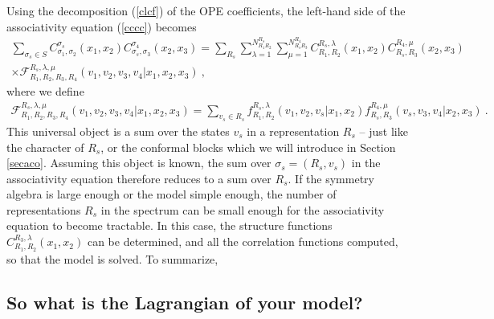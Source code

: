 \documentclass[12pt,a4paper,notitlepage]{report}
\numberwithin{equation}{section}
\theoremstyle{break}
\begin{document}
Using the decomposition (\ref{clcf}) of the OPE coefficients, 
the left-hand side of the 
associativity equation (\ref{cccc}) becomes
\begin{multline}
 \sum_{\sigma_s\in S} C_{\sigma_1,\sigma_2}^{\sigma_s}(x_1,x_2) C_{\sigma_s,\sigma_3}^{\sigma_4}(x_2,x_3) 
= \sum_{R_s}\sum_{\lambda=1}^{N_{R_1R_2}^{R_s}} \sum_{\mu=1}^{N_{R_sR_3}^{R_4}} C_{R_1,R_2}^{R_s,\lambda}(x_1,x_2) C_{R_s,R_3}^{R_4,\mu}(x_2,x_3)
\\ 
\times 
\mathcal{F}^{R_s,\lambda,\mu}_{R_1,R_2,R_3,R_4}(v_1,v_2,v_3,v_4|x_1,x_2,x_3)\ ,
\label{scce}
\end{multline}
where we define 
\begin{align}
 \mathcal{F}^{R_s,\lambda,\mu}_{R_1,R_2,R_3,R_4}(v_1,v_2,v_3,v_4|x_1,x_2,x_3) = \sum_{v_s\in R_s} f_{R_1,R_2}^{R_s,\lambda}(v_1,v_2,v_s|x_1,x_2) f_{R_s,R_3}^{R_4,\mu}(v_s,v_3,v_4|x_2,x_3) \ .
\end{align}
This universal object is a sum over the states $v_s$ in a representation $R_s$ -- just like the character of $R_s$, or the conformal blocks which we will introduce in Section \ref{secaco}.
Assuming this object is known, the sum over $\sigma_s=(R_s,v_s)$ in the associativity equation therefore reduces to a sum over $R_s$.
If the symmetry algebra is large enough or the model simple enough, the number of representations $R_s$ in the spectrum can be small enough for the associativity equation to become tractable.
In this case, the structure functions $C_{R_1,R_2}^{R_3,\lambda}(x_1,x_2)$ can be determined, and all the correlation functions computed, so that the model is solved.
To summarize,
\begin{center}
\end{center}


\subsection{So what is the Lagrangian of your model? \label{seclagr}}
\end{document}
